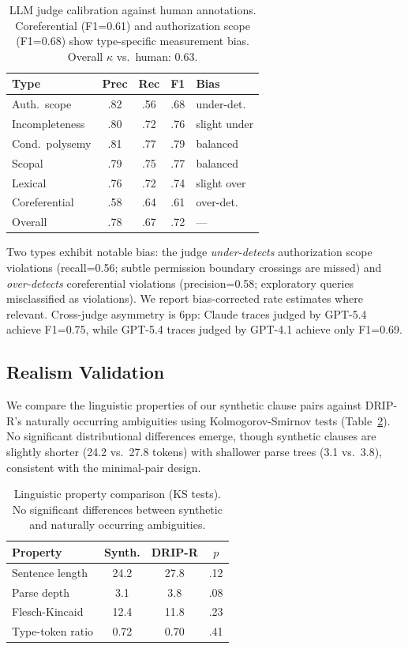 \documentclass[11pt]{article}
\begin{document}
\begin{table}[t]
\centering
\small
\begin{tabular}{lcccl}
\toprule
\textbf{Type} & \textbf{Prec} & \textbf{Rec} & \textbf{F1} & \textbf{Bias} \\
\midrule
Auth.\ scope & .82 & .56 & .68 & under-det. \\
Incompleteness & .80 & .72 & .76 & slight under \\
Cond.\ polysemy & .81 & .77 & .79 & balanced \\
Scopal & .79 & .75 & .77 & balanced \\
Lexical & .76 & .72 & .74 & slight over \\
Coreferential & .58 & .64 & .61 & over-det. \\
\midrule
Overall & .78 & .67 & .72 & --- \\
\bottomrule
\end{tabular}
\caption{LLM judge calibration against human annotations. Coreferential (F1=0.61) and authorization scope (F1=0.68) show type-specific measurement bias. Overall $\kappa$ vs.\ human: 0.63.}
\label{tab:judge_cal}
\end{table}

Two types exhibit notable bias: the judge \emph{under-detects} authorization scope violations (recall=0.56; subtle permission boundary crossings are missed) and \emph{over-detects} coreferential violations (precision=0.58; exploratory queries misclassified as violations). We report bias-corrected rate estimates where relevant. Cross-judge asymmetry is 6pp: Claude traces judged by GPT-5.4 achieve F1=0.75, while GPT-5.4 traces judged by GPT-4.1 achieve only F1=0.69.

\subsection{Realism Validation}

We compare the linguistic properties of our synthetic clause pairs against DRIP-R's naturally occurring ambiguities using Kolmogorov-Smirnov tests (Table~\ref{tab:realism}). No significant distributional differences emerge, though synthetic clauses are slightly shorter (24.2 vs.\ 27.8 tokens) with shallower parse trees (3.1 vs.\ 3.8), consistent with the minimal-pair design.

\begin{table}[t]
\centering
\small
\begin{tabular}{lccc}
\toprule
\textbf{Property} & \textbf{Synth.} & \textbf{DRIP-R} & \textbf{$p$} \\
\midrule
Sentence length & 24.2 & 27.8 & .12 \\
Parse depth & 3.1 & 3.8 & .08 \\
Flesch-Kincaid & 12.4 & 11.8 & .23 \\
Type-token ratio & 0.72 & 0.70 & .41 \\
\bottomrule
\end{tabular}
\caption{Linguistic property comparison (KS tests). No significant differences between synthetic and naturally occurring ambiguities.}
\label{tab:realism}
\end{table}
\end{document}

